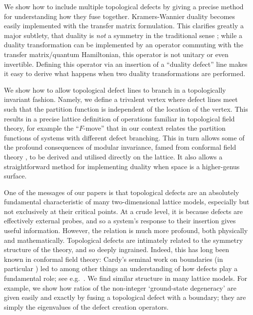 \documentclass[11pt]{article}
\numberwithin{equation}{section}		%
\begin{document}
We show how to include multiple topological defects by giving a precise method for understanding how they fuse together. Kramers-Wannier duality \cite{Kramers1941} becomes easily implemented with the transfer matrix formulation. This clarifies greatly a major subtlety, that duality is {\em not} a symmetry in the traditional sense \cite{Gaiotto}; while a duality transformation can be implemented by an operator commuting with the transfer matrix/quantum Hamiltonian, this operator is not unitary or even invertible. Defining this operator via an insertion of a ``duality defect'' line \cite{Schutz1993,Affleck1997,Grimm2003,Frohlich2004} makes it easy to derive what happens when two duality transformations are performed. 




We show how to allow topological defect lines to branch in a topologically invariant fashion. Namely, we define a trivalent vertex where defect lines meet such that the partition function is independent of the location of the vertex. This results in a precise lattice definition of operations familiar in topological field theory, for example the ``$F$-move'' \cite{MSReview89} that in our context relates the partition functions of systems with different defect branching. This in turn allows 
some of the profound consequences of modular invariance, famed from conformal field theory \cite{Cardy1986}, to be derived and utilised directly on the lattice. It also allows a straightforward method for implementing duality when space is a higher-genus surface.


One of the messages of our papers is that topological defects are an absolutely fundamental characteristic of many two-dimensional lattice models, especially but not exclusively at their critical points.  At a crude level, it is because defects are effectively external probes, and so a system's response to their insertion gives useful information.  
However, the relation is much more profound, both physically and mathematically. Topological defects are intimately related to the symmetry structure of the theory, and so deeply ingrained. Indeed, this has long been known in conformal field theory: Cardy's seminal work on boundaries (in particular \cite{Cardy1989}) led to among other things an understanding of how defects play a fundamental role; see e.g.\  \cite{Petkova2001,Petkova2001b,Runkel2002,Runkel2004,Runkel2004b,Runkel2005,Runkel2006,Frohlich:2006}. We find similar structure in many lattice models.  For example, we show how ratios of the non-integer `ground-state degeneracy' \cite{AffleckLudwig} are given easily and exactly by fusing a topological defect with a boundary; they are simply the eigenvalues of the defect creation operators.
\end{document}
